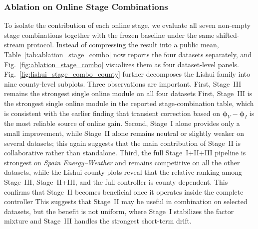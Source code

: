 ﻿\documentclass[journal]{IEEEtran}
\DeclareRobustCommand{\oldtext}[1]{{\color{revisionred}#1}}
\DeclareRobustCommand{\newtext}[1]{{\color{revisionblue}#1}}
\DeclareRobustCommand{\why}[1]{{\color{revisionblue}{\footnotesize (#1)}}}
\DeclareRobustCommand{\rw}[3]{\oldtext{#1} \newtext{#2}\why{#3}}
\begin{document}
\subsubsection{Ablation on Online Stage Combinations}
To isolate the contribution of each online stage, we evaluate all seven non-empty stage combinations together with the frozen baseline under the same shifted-stream protocol. Instead of compressing the result into a public mean, Table~\ref{tab:ablation_stage_combo} now reports the four datasets separately, and Fig.~\ref{fig:ablation_stage_combo} visualizes them as four dataset-level panels. Fig.~\ref{fig:lishui_stage_combo_county} further decomposes the Lishui family into nine county-level subplots. Three observations are important. \rw{First, Stage~III remains the strongest single online module on all four datasets}{First, Stage~III is the strongest single online module in the reported stage-combination table}{限定到表格证据。}, which is consistent with the earlier finding that transient correction based on $\boldsymbol{\phi}_V-\boldsymbol{\phi}_I$ is the most reliable source of online gain. Second, Stage~I alone provides only a small improvement, while Stage~II alone remains neutral or slightly weaker on several datasets; this again suggests that the main contribution of Stage~II is collaborative rather than standalone. Third, the full Stage~I+II+III pipeline is strongest on \textit{Spain Energy--Weather} and remains competitive on all the other datasets, while the Lishui county plots reveal that the relative ranking among Stage~III, Stage~II+III, and the full controller is county dependent. \rw{This confirms that Stage~II becomes beneficial once it operates inside the complete controller}{This suggests that Stage~II may be useful in combination on selected datasets, but the benefit is not uniform}{避免“confirms”过强。}, where Stage~I stabilizes the factor mixture and Stage~III handles the strongest short-term drift.
\end{document}
